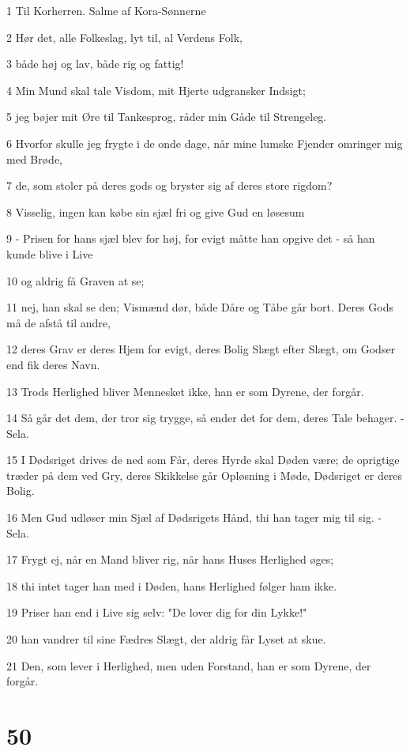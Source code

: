 \par 1 Til Korherren. Salme af Kora-Sønnerne
\par 2 Hør det, alle Folkeslag, lyt til, al Verdens Folk,
\par 3 både høj og lav, både rig og fattig!
\par 4 Min Mund skal tale Visdom, mit Hjerte udgransker Indsigt;
\par 5 jeg bøjer mit Øre til Tankesprog, råder min Gåde til Strengeleg.
\par 6 Hvorfor skulle jeg frygte i de onde dage, når mine lumske Fjender omringer mig med Brøde,
\par 7 de, som stoler på deres gods og bryster sig af deres store rigdom?
\par 8 Visselig, ingen kan købe sin sjæl fri og give Gud en løsesum
\par 9 - Prisen for hans sjæl blev for høj, for evigt måtte han opgive det - så han kunde blive i Live
\par 10 og aldrig få Graven at se;
\par 11 nej, han skal se den; Vismænd dør, både Dåre og Tåbe går bort. Deres Gods må de afstå til andre,
\par 12 deres Grav er deres Hjem for evigt, deres Bolig Slægt efter Slægt, om Godser end fik deres Navn.
\par 13 Trods Herlighed bliver Mennesket ikke, han er som Dyrene, der forgår.
\par 14 Så går det dem, der tror sig trygge, så ender det for dem, deres Tale behager. - Sela.
\par 15 I Dødsriget drives de ned som Får, deres Hyrde skal Døden være; de oprigtige træder på dem ved Gry, deres Skikkelse går Opløsning i Møde, Dødsriget er deres Bolig.
\par 16 Men Gud udløser min Sjæl af Dødsrigets Hånd, thi han tager mig til sig. - Sela.
\par 17 Frygt ej, når en Mand bliver rig, når hans Huses Herlighed øges;
\par 18 thi intet tager han med i Døden, hans Herlighed følger ham ikke.
\par 19 Priser han end i Live sig selv: "De lover dig for din Lykke!"
\par 20 han vandrer til sine Fædres Slægt, der aldrig får Lyset at skue.
\par 21 Den, som lever i Herlighed, men uden Forstand, han er som Dyrene, der forgår.

\chapter{50}

